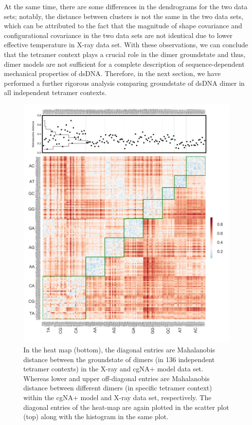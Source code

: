 At the same time, there are some differences in the dendrograms for the two data sets; notably, the distance between clusters is not the same in the two data sets, which can be attributed to the fact that the magnitude of shape covariance and configurational covariance in the two data sets are not identical due to lower effective temperature in X-ray data set.
With these observations, we can conclude that the tetramer context plays a crucial role in the dimer groundstate and thus, dimer models are not sufficient for a complete description of sequence-dependent mechanical properties of dsDNA. Therefore, in the next section, we have performed a further rigorous analysis comparing groundstate of dsDNA dimer in all independent tetramer contexts.

\begin{figure}[htb!]
	\begin{center}
	\centering\includegraphics[scale=1.45]{./Xray_images/Mahal_comb.png}
	\centering\caption{
	In the heat map (bottom), the diagonal entries are Mahalanobis distance between the groundstate of dimers (in 136 independent tetramer contexts) in the X-ray and cgNA$+$ model data set. Whereas lower and upper off-diagonal entries are Mahalanobis distance between different dimers (in specific tetramer context) within the cgNA$+$ model and X-ray data set, respectively. The diagonal entries of the heat-map are again plotted in the scatter plot (top) along with the histogram in the same plot.
}
\end{center}
\end{figure}

